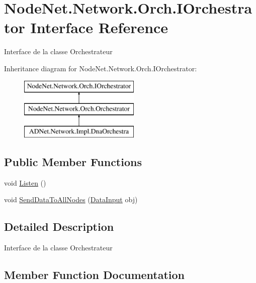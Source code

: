 \hypertarget{interface_node_net_1_1_network_1_1_orch_1_1_i_orchestrator}{}\section{Node\+Net.\+Network.\+Orch.\+I\+Orchestrator Interface Reference}
\label{interface_node_net_1_1_network_1_1_orch_1_1_i_orchestrator}


Interface de la classe Orchestrateur  


Inheritance diagram for Node\+Net.\+Network.\+Orch.\+I\+Orchestrator\+:\begin{figure}[H]
\begin{center}
\leavevmode
\includegraphics[height=3.000000cm]{interface_node_net_1_1_network_1_1_orch_1_1_i_orchestrator}
\end{center}
\end{figure}
\subsection*{Public Member Functions}
\begin{DoxyCompactItemize}
\item 
void \hyperlink{interface_node_net_1_1_network_1_1_orch_1_1_i_orchestrator_a7f0164bff7a43551534f015165ddd3d4}{Listen} ()
\item 
void \hyperlink{interface_node_net_1_1_network_1_1_orch_1_1_i_orchestrator_affcb97b9f7365e03c5604a763f703ae2}{Send\+Data\+To\+All\+Nodes} (\hyperlink{class_node_net_1_1_data_1_1_data_input}{Data\+Input} obj)
\end{DoxyCompactItemize}


\subsection{Detailed Description}
Interface de la classe Orchestrateur 



\subsection{Member Function Documentation}
\mbox{\label{interface_node_net_1_1_network_1_1_orch_1_1_i_orchestrator_a7f0164bff7a43551534f015165ddd3d4}} 
